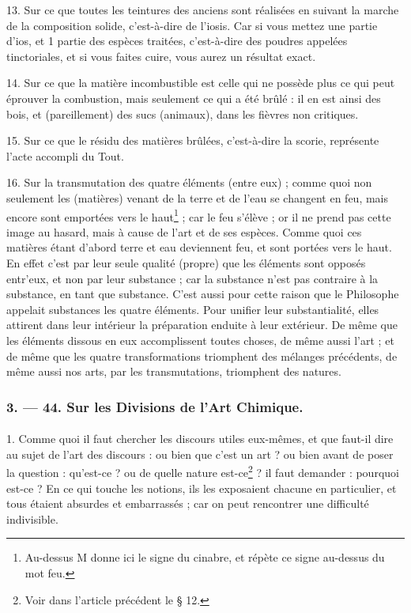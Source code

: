 \documentclass[landscape, a4paper, 11pt, oneside, polutonikogreek, french]{article}
\begin{document}
13. Sur ce que toutes les teintures des anciens sont réalisées en suivant la marche de la composition solide, c'est-à-dire de l'iosis. Car si vous mettez une partie d'ios, et 1 partie des espèces traitées, c'est-à-dire des poudres appelées tinctoriales, et si vous faites cuire, vous aurez un résultat exact.

14. Sur ce que la matière incombustible est celle qui ne possède plus ce qui peut éprouver la combustion, mais seulement ce qui a été brûlé : il en est ainsi des bois, et (pareillement) des sucs (animaux), dans les fièvres non critiques.

15. Sur ce que le résidu des matières brûlées, c'est-à-dire la scorie, représente l'acte accompli du Tout.

16. Sur la transmutation des quatre éléments (entre eux) ; comme quoi non seulement les (matières) venant de la terre et de l'eau se changent en feu, mais encore sont emportées vers le haut\footnote{Au-dessus M donne ici le signe du cinabre, et répète ce signe au-dessus du mot feu.} ; car le feu s'élève ; or il ne prend pas cette image au hasard, mais à cause de l'art et de ses espèces. Comme quoi ces matières étant d'abord terre et eau deviennent feu, et sont portées vers le haut. En effet c'est par leur seule qualité (propre) que les éléments sont opposés entr'eux, et non par leur substance ; car la substance n'est pas contraire à la substance, en tant que substance. C'est aussi pour cette raison que le Philosophe appelait substances les quatre éléments. Pour unifier leur substantialité, elles attirent dans leur intérieur la préparation enduite à leur extérieur. De même que les éléments dissous en eux accomplissent toutes choses, de même aussi l'art ; et de même que les quatre transformations triomphent des mélanges précédents, de même aussi nos arts, par les transmutations, triomphent des natures.

\bigskip
\centerline{\EightStarTaper}
\centerline{\EightStarTaper\EightStarTaper}
\bigskip

\subsubsection{3. --- 44. Sur les Divisions de l'Art Chimique.}
\paragraph{}
1. Comme quoi il faut chercher les discours utiles eux-mêmes, et que faut-il dire au sujet de l'art des discours : ou bien que c'est un art ? ou bien avant de poser la question : qu'est-ce ? ou de quelle nature est-ce\footnote{Voir dans l'article précédent le § 12.} ? il faut demander : pourquoi est-ce ? En ce qui touche les notions, ils les exposaient chacune en particulier, et tous étaient absurdes et embarrassés ; car on peut rencontrer une difficulté indivisible.
\end{document}
